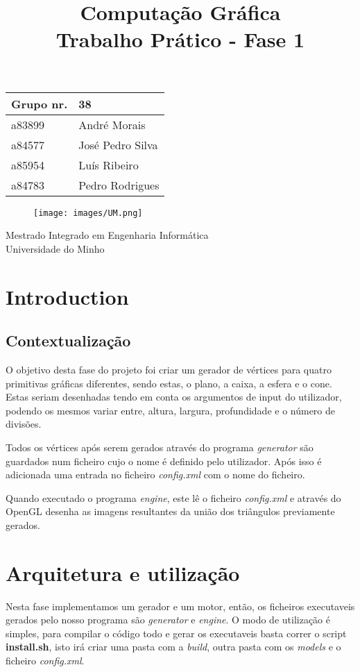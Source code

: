 \Huge\documentclass{article}
\title{
    \Huge Computação Gráfica \\
    \vspace{1cm}
    \LARGE Trabalho Prático - Fase 1
}
\author{}
\date{}
\begin{document}
\maketitle

\begin{center}\large

\begin{tabular}{ll}
\textbf{Grupo} nr. & 38
\\\hline
a83899 & André Morais
\\
a84577 & José Pedro Silva
\\
a85954 & Luís Ribeiro
\\
a84783 & Pedro Rodrigues
\end{tabular}
\end{center}

\begin{figure}[h]
\centering
\texttt{[image: images/UM.png]}
\end{figure}

\begin{center}
\large Mestrado Integrado em Engenharia Informática\\
        Universidade do Minho
\end{center}

\newpage

\section{Introduction}
\subsection{Contextualização}
O objetivo desta fase do projeto foi criar um gerador de vértices para quatro primitivas gráficas diferentes, sendo estas, o plano, a caixa, a esfera e o cone. Estas seriam desenhadas tendo em conta os argumentos de input do utilizador, podendo os mesmos variar entre, altura, largura, profundidade e o número de divisões.
\par Todos os vértices após serem gerados através do programa \textit{generator} são guardados num ficheiro cujo o nome é definido pelo utilizador. Após isso é adicionada uma entrada no ficheiro \textit{config.xml} com o nome do ficheiro.
\par Quando executado o programa \textit{engine}, este lê o ficheiro \textit{config.xml} e através do OpenGL desenha as imagens resultantes da união dos triângulos previamente gerados.
\newpage

\section{Arquitetura e utilização}
Nesta fase implementamos um gerador e um motor, então, os ficheiros executaveis gerados pelo nosso programa são \textit{generator} e \textit{engine}. O modo de utilização é simples, para compilar o código todo e gerar os executaveis basta correr o script \textbf{install.sh}, isto irá criar uma pasta com a \textit{build}, outra pasta com os \textit{models} e o ficheiro \textit{config.xml}.
\end{document}
